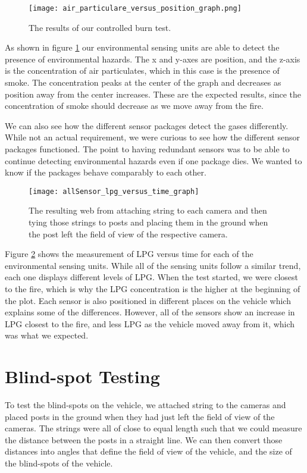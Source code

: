 \begin{figure}[H]
\centerline{\texttt{[image: air\_particulare\_versus\_position\_graph.png]}}
\caption[]{The results of our controlled burn test.}
\label{fig:air_particulate_versus_position_graph}
\end{figure}

As shown in figure \ref{fig:air_particulate_versus_position_graph} our environmental sensing units are able to detect the presence of environmental hazards.  The x and y-axes are position, and the z-axis is the concentration of air particulates, which in this case is the presence of smoke.  The concentration peaks at the center of the graph and decreases as position away from the center increases.  These are the expected results, since the concentration of smoke should decrease as we move away from the fire.

We can also see how the different sensor packages detect the gases differently.  While not an actual requirement, we were curious to see how the different sensor packages functioned.  The point to having redundant sensors was to be able to continue detecting environmental hazards even if one package dies.  We wanted to know if the packages behave comparably to each other.


\begin{figure}[H]
\centerline{\texttt{[image: allSensor\_lpg\_versus\_time\_graph]}}
\caption[]{The resulting web from attaching string to each camera and then tying those strings to posts and placing them in the ground when the post left the field of view of the respective camera.}
\label{fig:allSensor_lpg_versus_time_graph}
\end{figure}

Figure \ref{fig:allSensor_lpg_versus_time_graph} shows the measurement of LPG versus time for each of the environmental sensing units.  While all of the sensing units follow a similar trend, each one displays different levels of LPG.  When the test started, we were closest to the fire, which is why the LPG concentration is the higher at the beginning of the plot.  Each sensor is also positioned in different places on the vehicle which explains some of the differences.  However, all of the sensors show an increase in LPG closest to the fire, and less LPG as the vehicle moved away from it, which was what we expected.

\section{Blind-spot Testing}
To test the blind-spots on the vehicle, we attached string to the cameras and placed posts in the ground when they had just left the field of view of the cameras.  The strings were all of close to equal length such that we could measure the distance between the posts in a straight line.  We can then convert those distances into angles that define the field of view of the vehicle, and the size of the blind-spots of the vehicle.


